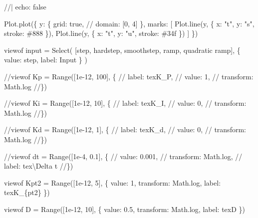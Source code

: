 \documentclass[
  letterpaper,
  DIV=11]{scrreprt}
\newenvironment{Shaded}{\begin{snugshade}}{\end{snugshade}}
\newcommand{\NormalTok}[1]{\textcolor[rgb]{0.00,0.23,0.31}{#1}}
\begin{document}
\begin{Shaded}
\begin{Highlighting}[]
\NormalTok{//| echo: false}

\NormalTok{Plot.plot(\{}
\NormalTok{  y: \{}
\NormalTok{    grid: true,}
\NormalTok{  //  domain: [0, 4]}
\NormalTok{  \},}
\NormalTok{  marks: [}
\NormalTok{    Plot.line(y, \{}
\NormalTok{      x: "t",}
\NormalTok{      y: "s",}
\NormalTok{      stroke: \textquotesingle{}\#888\textquotesingle{}}
\NormalTok{    \}),}
\NormalTok{    Plot.line(y, \{ x: "t", y: "u", stroke: \textquotesingle{}\#34f\textquotesingle{} \})}
\NormalTok{  ]}
\NormalTok{\})}

\NormalTok{viewof input = Select(}
\NormalTok{  [\textquotesingle{}step\textquotesingle{}, \textquotesingle{}hardstep\textquotesingle{}, \textquotesingle{}smoothstep\textquotesingle{}, \textquotesingle{}ramp\textquotesingle{}, \textquotesingle{}quadratic ramp\textquotesingle{}],}
\NormalTok{  \{}
\NormalTok{    value: \textquotesingle{}step\textquotesingle{},}
\NormalTok{    label: \textquotesingle{}Input\textquotesingle{}}
\NormalTok{  \}}
\NormalTok{)}

\NormalTok{//viewof Kp = Range([1e{-}12, 100], \{}
\NormalTok{//  label: tex\textasciigrave{}K\_P\textasciigrave{},}
\NormalTok{//  value: 1,}
\NormalTok{//  transform: Math.log}
\NormalTok{//\})}

\NormalTok{//viewof Ki = Range([1e{-}12, 10], \{}
\NormalTok{//  label: tex\textasciigrave{}K\_I\textasciigrave{},}
\NormalTok{//  value: 0,}
\NormalTok{//  transform: Math.log}
\NormalTok{//\})}

\NormalTok{//viewof Kd = Range([1e{-}12, 1], \{}
\NormalTok{//  label: tex\textasciigrave{}K\_d\textasciigrave{},}
\NormalTok{//  value: 0,}
\NormalTok{//  transform: Math.log}
\NormalTok{//\})}

\NormalTok{//viewof dt = Range([1e{-}4, 0.1], \{}
\NormalTok{//  value: 0.001,}
\NormalTok{//  transform: Math.log,}
\NormalTok{//  label: tex\textasciigrave{}\textbackslash{}Delta t\textasciigrave{}}
\NormalTok{//\})}

\NormalTok{viewof Kpt2 = Range([1e{-}12, 5], \{}
\NormalTok{  value: 1,}
\NormalTok{  transform: Math.log,}
\NormalTok{  label: tex\textasciigrave{}K\_\{pt2\}\textasciigrave{}}
\NormalTok{\})}

\NormalTok{viewof D = Range([1e{-}12, 10], \{}
\NormalTok{  value: 0.5,}
\NormalTok{  transform: Math.log,}
\NormalTok{  label: tex\textasciigrave{}D\textasciigrave{}}
\NormalTok{\})}


\end{Highlighting}
\end{Shaded}
\end{document}

